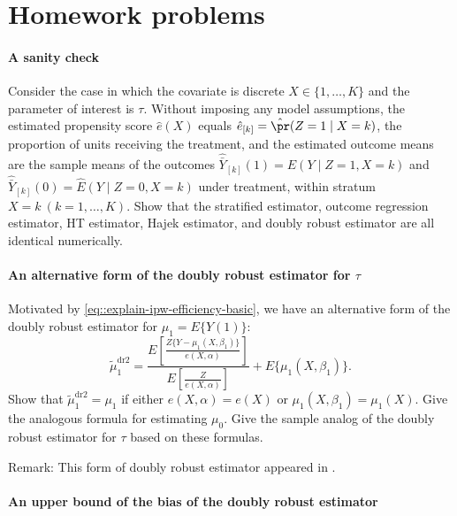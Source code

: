 \section{Homework problems}



 \paragraph{A sanity check}\label{hw::discreteX-obs}
Consider the case in which the covariate is discrete $X \in \{1, \ldots, K\}$ and the parameter of interest is $\tau$. Without imposing any model assumptions, the estimated propensity score $\hat{e}(X)$ equals $\hat{e}_{[k]} = \hat{\pr}(Z=1\mid X=k) $, the proportion of units receiving the treatment, and the estimated outcome means are the sample means of the outcomes $\hat{\bar{Y}}_{[k]}(1)  = \hat{E}(Y\mid Z=1, X=k) $ and $\hat{\bar{Y}}_{[k]}(0)  = \hat{E}(Y\mid Z=0, X=k) $ under treatment, within stratum $X=k\ (k=1, \ldots, K)$. Show that the stratified estimator, outcome regression estimator, HT estimator, Hajek estimator, and doubly robust estimator are all identical numerically. 
 


\paragraph{An alternative form of the doubly robust estimator for $\tau$}\label{hw::alternative-dr2-robins}

Motivated by \eqref{eq::explain-ipw-efficiency-basic}, we have an alternative form of the doubly robust estimator for $\mu_1 = E\{ Y(1) \} $: 
$$
\tilde{\mu}_1^\text{dr2} = 
\frac{ E\left[   \frac{Z\{ Y-\mu_1(X,\beta_1) \}}{  e(X,\alpha) } \right] }{E\left[   \frac{Z }{  e(X,\alpha) } \right]} 
 + E\{ \mu_1(X, \beta_1)  \} .
$$
Show that $\tilde{\mu}_1^\text{dr2} = \mu_1$ if either $e(X,\alpha)  = e(X)$ or $\mu_1(X, \beta_1) =  \mu_1(X)$. Give the analogous formula for estimating $\mu_0$. Give the sample analog of the doubly robust estimator for $\tau$ based on these formulas. 

Remark: 
This form of doubly robust estimator appeared in \citet{robins2007comment}. 



\paragraph{An upper bound of the bias of the doubly robust estimator}\label{hw::upperbound-dr}


